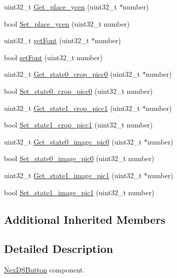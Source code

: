 \begin{DoxyCompactItemize}
uint32\+\_\+t \hyperlink{class_nex_d_s_button_a2b5c825ceaeeaa588b4830da4f154b23}{Get\+\_\+place\+\_\+ycen} (uint32\+\_\+t $\ast$number)
\item 
bool \hyperlink{class_nex_d_s_button_a356b829500f25b3d5050084474da1165}{Set\+\_\+place\+\_\+ycen} (uint32\+\_\+t number)
\item 
uint32\+\_\+t \hyperlink{class_nex_d_s_button_a3010cd4aa559a30088ad9bf987003adc}{get\+Font} (uint32\+\_\+t $\ast$number)
\item 
bool \hyperlink{class_nex_d_s_button_a2ac5df458d5da7ffdc32bc16160472f8}{set\+Font} (uint32\+\_\+t number)
\item 
uint32\+\_\+t \hyperlink{class_nex_d_s_button_aa48f68183cdbb94e376f1ca0367a2f2c}{Get\+\_\+state0\+\_\+crop\+\_\+picc0} (uint32\+\_\+t $\ast$number)
\item 
bool \hyperlink{class_nex_d_s_button_a8a0427fa8a95021452da9af2f0834eee}{Set\+\_\+state0\+\_\+crop\+\_\+picc0} (uint32\+\_\+t number)
\item 
uint32\+\_\+t \hyperlink{class_nex_d_s_button_a9b24e1ec4677bc8ec921ede2e36c4db6}{Get\+\_\+state1\+\_\+crop\+\_\+picc1} (uint32\+\_\+t $\ast$number)
\item 
bool \hyperlink{class_nex_d_s_button_a1cc8c53007bf420a5e02e0c885ab7460}{Set\+\_\+state1\+\_\+crop\+\_\+picc1} (uint32\+\_\+t number)
\item 
uint32\+\_\+t \hyperlink{class_nex_d_s_button_a8382bc9350b8e589d1ae5da684a0e907}{Get\+\_\+state0\+\_\+image\+\_\+pic0} (uint32\+\_\+t $\ast$number)
\item 
bool \hyperlink{class_nex_d_s_button_a24029fce19d9a0f75a6044e7a44bd925}{Set\+\_\+state0\+\_\+image\+\_\+pic0} (uint32\+\_\+t number)
\item 
uint32\+\_\+t \hyperlink{class_nex_d_s_button_ab52951034a07ac78a9bde09c0bae4514}{Get\+\_\+state1\+\_\+image\+\_\+pic1} (uint32\+\_\+t $\ast$number)
\item 
bool \hyperlink{class_nex_d_s_button_a8d8aafa1a4970faed893db0b666e38b0}{Set\+\_\+state1\+\_\+image\+\_\+pic1} (uint32\+\_\+t number)
\end{DoxyCompactItemize}
\subsection*{Additional Inherited Members}


\subsection{Detailed Description}
\hyperlink{class_nex_d_s_button}{Nex\+D\+S\+Button} component.


